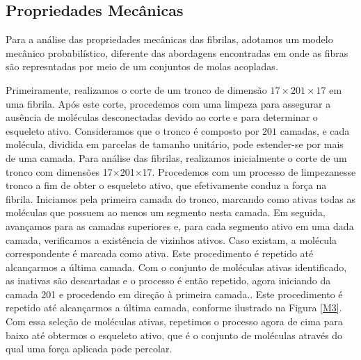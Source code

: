 \documentclass{report}
\begin{document}
    \subsection{Propriedades Mecânicas} 

        \indent Para a análise das propriedades mecânicas das fibrilas, adotamos um modelo mecânico probabilístico\cite{Parkinson1997}, 
        diferente das abordagens encontradas em \cite{Saitoh2020MolecularDS} onde as fibras são represntadas por meio de um conjuntos de 
        molas acopladas.
        
        Primeiramente, realizamos o corte de um tronco de dimensão \(17 \times 201 \times 17\) em uma fibrila. Após este 
        corte, procedemos com uma limpeza para assegurar a ausência de moléculas desconectadas devido ao corte e para 
        determinar o esqueleto ativo. Consideramos que o tronco é composto por \(201\) camadas, e cada molécula, dividida 
        em parcelas de tamanho unitário, pode estender-se por mais de uma camada. Para análise das fibrilas, realizamos 
        inicialmente o corte de um tronco com dimensões 17×201×17. Procedemos com um processo de limpezanesse tronco a fim 
        de obter o esqueleto ativo, que efetivamente conduz a força na fibrila. Iniciamos pela primeira camada do tronco, 
        marcando como ativas todas as moléculas que possuem ao menos um segmento nesta camada. Em seguida, avançamos para 
        as camadas superiores e, para cada segmento ativo em uma dada camada, verificamos a existência de vizinhos ativos. 
        Caso existam, a molécula correspondente é marcada como ativa. Este procedimento é repetido até alcançarmos a última 
        camada. Com o conjunto de moléculas ativas identificado, as inativas são descartadas e o processo é então repetido, 
        agora iniciando da camada 201 e procedendo em direção à primeira camada.. Este procedimento é repetido até alcançarmos a última camada, conforme 
        ilustrado na Figura \ref{M3}. Com essa seleção de moléculas ativas, repetimos o processo agora de cima para baixo 
        até obtermos o esqueleto ativo, que é o conjunto de moléculas através do qual uma força aplicada pode percolar. 
\end{document}
